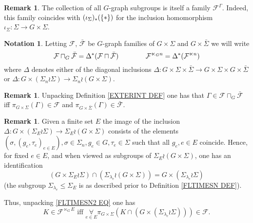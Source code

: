 \documentclass[a4paper,10pt
,draft
]{article}%
\numberwithin{equation}{section}
\numberwithin{figure}{section}
\theoremstyle{definition} %
\newtheorem{remark}[equation]{Remark}%
\newtheorem{notation}[equation]{Notation}%
\newcommand{\1}{\ensuremath{\mathbbm 1}}%
\begin{document}
\begin{remark}
	The collection of all $G$-graph subgroups is itself a family $\mathcal{F}^{\Gamma}$. Indeed, this family  coincides with 
	$(\iota_{\Sigma})_{\**}(\{\**\})$
for the inclusion homomorphism 
$\iota_{\Sigma} \colon \Sigma \to G \times \Sigma$.
\end{remark}


\begin{notation}\label{SEMIDIRG NOT}
Letting $\mathcal{F}$, $\bar{\mathcal{F}}$ be $G$-graph families of $G \times \Sigma$ and $G \times \bar{\Sigma}$ we will write
\[
	\mathcal{F} \sqcap_G \bar{\mathcal{F}} 
	= \Delta^{\**} (\mathcal{F} \sqcap \bar{\mathcal{F}} )
\qquad \qquad
	\mathcal{F}^{\ltimes_G n} = \Delta^{\**} (\mathcal{F}^{\ltimes n})
\]
where $\Delta$ denotes either of the diagonal inclusions
$\Delta \colon 
G \times \Sigma \times \bar{\Sigma} \to 
G \times \Sigma \times G \times \bar{\Sigma}$
or 
$\Delta \colon G \times (\Sigma_n \wr \Sigma)
 \to 
\Sigma_n \wr (G \times \Sigma)$.
\end{notation}


\begin{remark}\label{UNPACKINGSQCAP REM}
	Unpacking Definition \ref{EXTERINT DEF} one has that 
	$\Gamma \in \mathcal{F} \sqcap_G \bar{\mathcal{F}}$ iff
	$\pi_{G \times \Sigma}(\Gamma) \in \mathcal{F}$ and
	$\pi_{G \times \bar{\Sigma}}(\Gamma) \in \bar{\mathcal{F}}$.
\end{remark}



\begin{remark}\label{UNPACKINGLTIMES REM}
Given a finite set $E$
the image of the inclusion	
$\Delta \colon G \times (\Sigma_E \wr \Sigma)
\to 
\Sigma_E \wr (G \times \Sigma)$
consists of the elements
$(\sigma,(g_e,\tau_e)_{e \in E}),
\sigma \in \Sigma_n,
g_e \in G,
\tau_e \in \Sigma$
such that all $g_e, e \in E$ coincide.
Hence, for fixed $e\in E$,
and when viewed as subgroups of $\Sigma_E \wr (G \times \Sigma)$,
one has an identification
\[
	\left(G \times \Sigma_E \wr \Sigma\right)
	\cap
	\left(
	\Sigma_{\lambda_e} \wr (G \times \Sigma)
	\right)
=
	G \times (\Sigma_{\lambda_e} \wr \Sigma)
\]
(the subgroup $\Sigma_{\lambda_e} \leq \Sigma_E$ is as described prior to Definition \ref{FLTIMESN DEF}).

Thus, unpacking \eqref{FLTIMESN2 EQ} one has  
\[
	K \in \mathcal{F}^{\ltimes_G E} 
	\text{ iff }
	\underset{e \in E}{\forall} \pi_{G \times \Sigma}
	\left(
		K \cap 
		\left(G \times (\Sigma_{\lambda_e} \wr \Sigma) \right)
	\right)
	\in \mathcal{F}.
\]
\end{remark}
\end{document}
